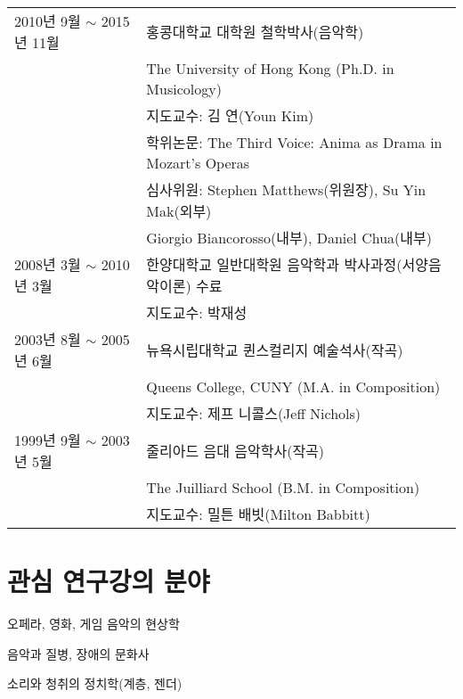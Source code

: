 \documentclass[dvipdfmx,a4paper]{article}
\begin{document}
  \hspace*{-0.25cm}
  \begin{tabular}{p{4.0cm} p{10.0cm}}
    2010년 9월 $\sim$ 2015년 11월 & 홍콩대학교 대학원 철학박사(음악학)\\
    & The University of Hong Kong (Ph.D. in Musicology)\\
    & 지도교수: 김 연(Youn Kim)\\
    & 학위논문: The Third Voice: Anima as Drama in Mozart’s Operas\\
    & 심사위원: Stephen Matthews(위원장), Su Yin Mak(외부)\\
    & \hspace*{14mm} Giorgio Biancorosso(내부), Daniel Chua(내부)\\[2mm]
    
    2008년 3월 $\sim$ 2010년 3월 & 한양대학교 일반대학원 음악학과 박사과정(서양음악이론) 수료\\
    & 지도교수: 박재성\\[2mm]
    
	2003년 8월 $\sim$ 2005년 6월 & 뉴욕시립대학교 퀸스컬리지 예술석사(작곡)\\
    & Queens College, CUNY (M.A. in Composition)\\
	& 지도교수: 제프 니콜스(Jeff Nichols)\\[2mm]

    1999년 9월 $\sim$ 2003년 5월 & 줄리아드 음대 음악학사(작곡)\\
    & The Juilliard School (B.M. in Composition)\\
    & 지도교수: 밀튼 배빗(Milton Babbitt)
  \end{tabular}
  
  \vspace{5mm}
  
  \section*{\normalsize 관심 연구\textperiodcentered 강의 분야}
  
  \hspace{2mm} \textbullet \hspace{2mm} 오페라, 영화, 게임 음악의 현상학
  
  \noindent \hspace{2mm} \textbullet \hspace{2mm} 음악과 질병, 장애의 문화사
  
  \noindent \hspace{2mm} \textbullet \hspace{2mm} 소리와 청취의 정치학(계층, 젠더)
  
\end{document}
